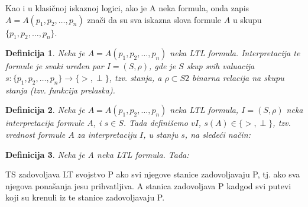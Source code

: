 \documentclass[a4paper]{article}
\newtheorem{definicija}{Definicija}[section]
\begin{document}
{	Kao i u klasičnoj iskaznoj logici, ako je A neka formula, onda zapis $A = A(p_1, p_2, \dots , p_n)$ znači da su sva iskazna slova formule $A$ u skupu $\{p_1, p_2, \dots , p_n\}$.
\begin{definicija}
Neka je $A = A(p_1, p_2, \dots , p_n)$ neka LTL formula. Interpretacija te formule je svaki uređen par $I = (S, \rho)$, gde je $S$ skup svih valuacija $s : \{p_1, p_2, \dots , p_n\} \to \{>, \perp \}$, tzv. stanja, a $\rho \subset S2$ binarna relacija na skupu stanja (tzv. funkcija prelaska).
\end{definicija}
\begin{definicija}    
Neka je $A = A(p_1, p_2, \dots , p_n)$ neka LTL formula, $I = (S, \rho)$ neka interpretacija formule $A$, i $s \in S$. Tada definišemo $vI$, $s(A) \in \{>, \perp \}$, tzv. vrednost formule $A$ za interpretaciju $I$, u stanju $s$, na sledeći način:
\end{definicija} 
\begin{definicija}
Neka je A neka LTL formula. Tada:
\end{definicija}
	TS zadovoljava LT svojstvo P ako svi njegove stanice zadovoljavaju P, tj. ako sva njegova ponašanja jesu prihvatljiva. A stanica zadovoljava P kadgod svi putevi koji su krenuli iz te stanice zadovoljavaju P.

}
\end{document}
